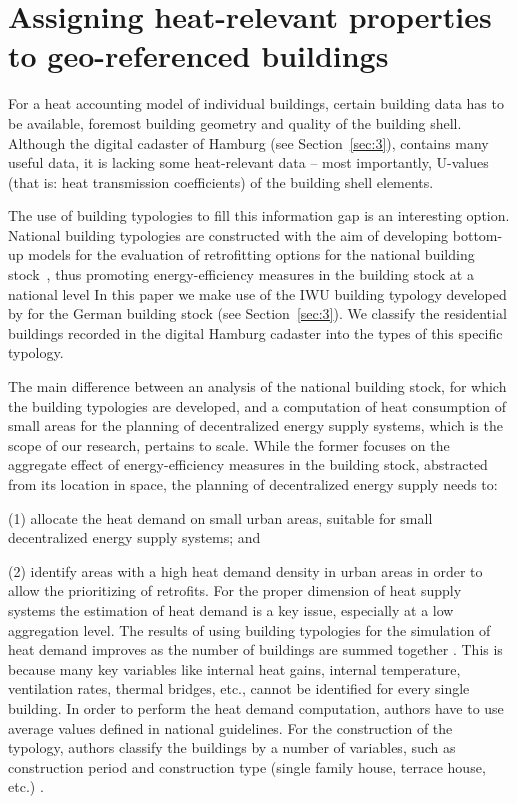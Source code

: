 \documentclass[11pt]{IJM-article}
\begin{document}
\section{Assigning heat-relevant properties to geo-referenced buildings}
\label{sec:6}

For a heat accounting model of individual buildings, certain building data has
to be available, foremost building geometry and quality of the building shell.
Although the digital cadaster of Hamburg (see Section~\ref{sec:3}), contains
many useful data, it is lacking some heat-relevant data – most importantly,
U-values (that is: heat transmission coefficients) of the building shell
elements.

The use of building typologies to fill this information gap is an interesting
option. National building typologies are constructed with the aim of developing
bottom-up models for the evaluation of retrofitting options for the national
building stock~\cite{TABULAProjectTeam.2012b}, thus promoting energy-efficiency
measures in the building stock at a national level  In this paper we make use of the IWU building
typology developed by  for the German building stock (see
Section~\ref{sec:3}). We classify the residential buildings recorded in the
digital Hamburg cadaster into the types of this specific typology.

The main difference between an analysis of the national building stock, for
which the building typologies are developed, and a computation of heat
consumption of small areas for the planning of decentralized energy supply
systems, which is the scope of our research, pertains to scale.  While the
former focuses on the aggregate effect of energy-efficiency measures in the
building stock, abstracted from its location in space, the planning of
decentralized energy supply needs to:

(1) allocate the heat demand on small urban areas, suitable for small
decentralized energy supply systems; and

(2) identify areas with a high heat demand density in urban areas in order to
allow the prioritizing of retrofits. For the proper dimension of heat supply
systems the estimation of heat demand is a key issue, especially at a low
aggregation level. The results of using building typologies for the simulation
of heat demand improves as the number of buildings are summed together
.  This is because many key variables like internal heat
gains, internal temperature, ventilation rates, thermal bridges, etc., cannot
be identified for every single building.  In order to perform the heat demand
computation, authors have to use average values defined in national guidelines.
For the construction of the typology, authors classify the buildings by a
number of variables, such as construction period and construction type (single
family house, terrace house, etc.) .
\end{document}
